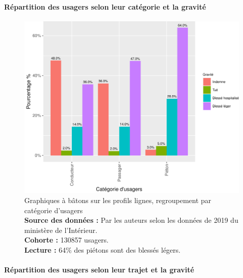 \documentclass[french,]{tp}
\let\oldparagraph\paragraph
\renewcommand{\paragraph}[1]{\oldparagraph{#1}\mbox{}}
\begin{document}
\hypertarget{ruxe9partition-des-usagers-selon-leur-catuxe9gorie-et-la-gravituxe9}{%
\paragraph{Répartition des usagers selon leur catégorie et la gravité}\label{ruxe9partition-des-usagers-selon-leur-catuxe9gorie-et-la-gravituxe9}}






\begin{figure}[ht!]

{\centering \includegraphics{Prediction_Gravite_files/figure-latex/barplotcatu-1} 

}

\caption{Graphiques à bâtons sur les profils lignes, regroupement par catégorie d'usagers\\
\textbf{Source des données :} Par les auteurs selon les données de 2019 du ministère de l'Intérieur.\\
\textbf{Cohorte :} 130857 usagers.\\
\textbf{Lecture :} 64\% des piétons sont des blessés légers.}\label{fig:barplotcatu}
\end{figure}

\newpage

\hypertarget{ruxe9partition-des-usagers-selon-leur-trajet-et-la-gravituxe9}{%
\paragraph{Répartition des usagers selon leur trajet et la gravité}\label{ruxe9partition-des-usagers-selon-leur-trajet-et-la-gravituxe9}}
\end{document}
